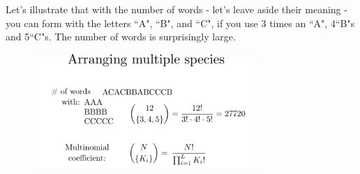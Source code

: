 \documentclass[12pt, a4paper]{scrartcl}
\begin{document}
Let’s illustrate that with the number of words - let's leave aside their meaning - you can form with the letters ``A", ``B", and ``C", if you use 3 times an ``A", 4``B"s and 5``C"s.
The number of words is surprisingly large.\\
 \begin{figure}[H]
	\centering
	\includegraphics[width=0.75\textwidth]{4_4.png}
\end{figure}
\end{document}
